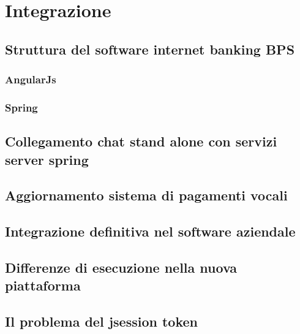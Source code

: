 \chapter{Integrazione}

\section{Struttura del software internet banking BPS}

\subsection{AngularJs}

\subsection{Spring}

\section{Collegamento chat stand alone con servizi server spring}

\section{Aggiornamento sistema di pagamenti vocali}

\section{Integrazione definitiva nel software aziendale}

\section{Differenze di esecuzione nella nuova piattaforma}

\section{Il problema del jsession token}

\iffalse
<inizio integrazione del prototipo, vedi: https://github.com/Wabri/UniversityInternship/blob/master/README.md\#day-41-280818--7-ore>
<trasformazione delle librerie usate nel prototipo con strumenti angularjs>
<refactor del prototipo>
<speech recognition in angularjs>
<synth voice in angularjs>
<creazione del server rasa su server aziendale>
<creazione della documentazione nella wiki best vision>
<varie modifiche per tentare di risolvere il problema di non mi ricordo cosa>
\fi
